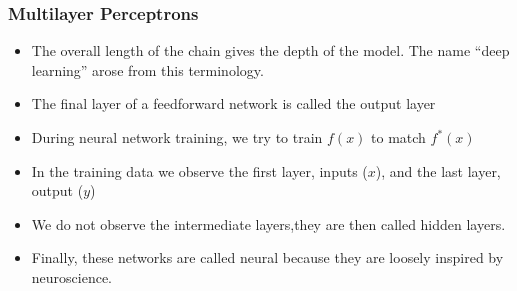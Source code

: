\documentclass[
  shownotes,
  xcolor={svgnames},
  hyperref={colorlinks,citecolor=DarkBlue,linkcolor=DarkRed,urlcolor=DarkBlue}
  , aspectratio=169]{beamer}
\begin{document}
\begin{frame}
\frametitle{Multilayer Perceptrons}


\begin{itemize}



\item The overall length of the chain gives the depth of the model. The name “deep learning” arose from this terminology. 
\medskip
\item The ﬁnal layer of a feedforward network is called the
output layer
\medskip
\item During neural network training, we try to train $f(x)$ to match $f^*(x)$
\medskip
\item In the training data we observe the first layer, inputs ($x$), and the last layer, output ($y$)
\medskip
\item We do not observe the intermediate layers,they are then called hidden layers.
\medskip
\item Finally, these networks are called neural because they are loosely inspired by
neuroscience.



\end{itemize}
\end{frame}

\end{document}
